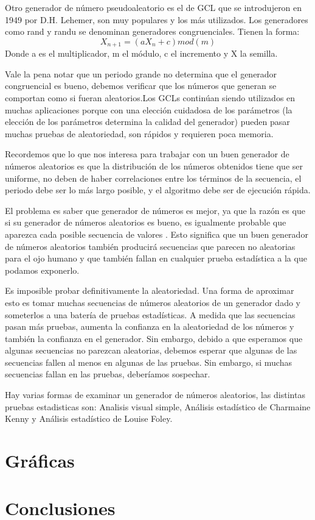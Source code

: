 Otro generador de número pseudoaleatorio es el de GCL que se introdujeron en 1949 por D.H. Lehemer, son muy populares y los más utilizados. Los generadores como rand y randu se denominan generadores congruenciales. Tienen la forma:
\begin{equation}
    X_{n+1} = (aX_{n}+c)mod(m)
\end{equation}
Donde a es el multiplicador, m el módulo, c el incremento y X la semilla.

Vale la pena notar que un periodo grande no determina que el generador congruencial es bueno, debemos verificar que los números que generan se comportan como si fueran aleatorios.Los GCLs continúan siendo utilizados en muchas aplicaciones porque con una elección cuidadosa de los parámetros (la elección de los parámetros determina la calidad del generador) pueden pasar muchas pruebas de aleatoriedad, son rápidos y requieren poca memoria.

Recordemos que lo que nos interesa para trabajar con un buen generador de números aleatorios es que la distribución de los números obtenidos tiene que ser uniforme, no deben de haber correlaciones entre los términos de la secuencia, el periodo debe ser lo más largo posible, y el algoritmo debe ser de ejecución rápida.

El problema es saber que generador de números es mejor, ya que la razón es que si su generador de números aleatorios es bueno, es igualmente probable que aparezca cada posible secuencia de valores . Esto significa que un buen generador de números aleatorios también producirá secuencias que parecen no aleatorias para el ojo humano y que también fallan en cualquier prueba estadística a la que podamos exponerlo. 


Es imposible probar definitivamente la aleatoriedad. Una forma de aproximar esto es tomar muchas secuencias de números aleatorios de un generador dado y someterlos a una batería de pruebas estadísticas. A medida que las secuencias pasan más pruebas, aumenta la confianza en la aleatoriedad de los números y también la confianza en el generador. Sin embargo, debido a que esperamos que algunas secuencias no parezcan aleatorias, debemos esperar que algunas de las secuencias fallen al menos en algunas de las pruebas. Sin embargo, si muchas secuencias fallan en las pruebas, deberíamos sospechar.

Hay varias formas de examinar un generador de números aleatorios, las distintas pruebas estadisticas son: Analisis visual simple, Análisis estadístico de Charmaine Kenny y Análisis estadístico de Louise Foley.
 




\section{Gráficas}


\section{Conclusiones}
